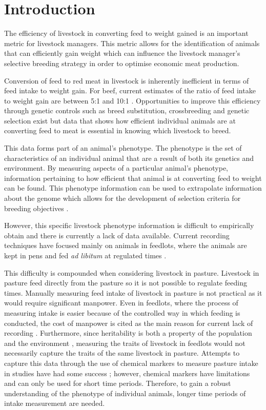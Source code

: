 \chapter{Introduction}

The efficiency of livestock in converting feed to weight gained is an important metric for livestock managers. This metric allows for the identification of animals that can efficiently gain weight which can influence the livestock manager's selective breeding strategy in order to optimise economic meat production. 

Conversion of feed to red meat in livestock is inherently inefficient in terms of feed intake to weight gain. For beef, current estimates of the ratio of feed intake to weight gain are between 5:1 and 10:1 \cite{Garnett2009}. Opportunities to improve this efficiency through genetic controls such as breed substitution, crossbreeding and genetic selection exist \cite{Hill2012} but data that shows how efficient individual animals are at converting feed to meat is essential in knowing which livestock to breed. 

This data forms part of an animal's phenotype. The phenotype is the set of characteristics of an individual animal that are a result of both its genetics and environment. By measuring aspects of a particular animal's phenotype, information pertaining to how efficient that animal is at converting feed to weight can be found. This phenotype information can be used to extrapolate information about the genome which allows for the development of selection criteria for breeding objectives \cite{Pollak2012}. 

However, this specific livestock phenotype information is difficult to empirically obtain and there is currently a lack of data available. Current recording techniques have focused mainly on animals in feedlots, where the animals are kept in pens and fed \textit{ad libitum} at regulated times \cite{Arthur2005}.

This difficulty is compounded when considering livestock in pasture. Livestock in pasture feed directly from the pasture so it is not possible to regulate feeding times. Manually measuring feed intake of livestock in pasture is not practical as it would require significant manpower. Even in feedlots, where the process of measuring intake is easier because of the controlled way in which feeding is conducted, the cost of manpower is cited as the main reason for current lack of recording \cite{Barwick2010}. Furthermore, since heritability is both a property of the population and the environment \cite{Falconer1996}, measuring the traits of livestock in feedlots would not necessarily capture the traits of the same livestock in pasture. Attempts to capture this data through the use of chemical  markers to measure pasture intake in studies have had some success \cite{Barlow2009} \cite{Dove2006}; however, chemical markers have limitations and can only be used for short time periods. Therefore, to gain a robust understanding of the phenotype of individual animals, longer time periods of intake measurement are needed.

